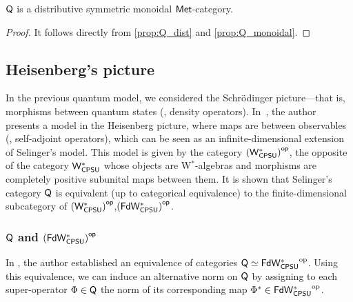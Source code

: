 \begin{theorem}
  $\mathsf{Q}$ is a distributive symmetric monoidal $\mathsf{Met}$-category. 
\end{theorem}

\begin{proof}
  It follows directly from \autoref{prop:Q_dist} and  \autoref{prop:Q_monoidal}.
\end{proof}


\subsection{Heisenberg's picture} \label{subsec:w*_cats}

In the previous quantum model, we considered the Schr\"odinger picture---that is, morphisms between quantum states (\ie, density operators). In~\cite{choSemanticsQuantumProgramming2016}, the author presents a model in the Heisenberg picture, where maps are between observables (\ie, self-adjoint operators), which can be seen as an infinite-dimensional extension of Selinger’s model. This model is given by the category $\left(\mathsf{W^*_{CPSU}}\right)^{\mathsf{op}}$, the opposite of the category $\mathsf{W^*_{CPSU}}$ whose objects are W$^*$-algebras and morphisms are completely positive subunital maps between them. It is shown that Selinger’s category $\mathsf{Q}$ is equivalent (up to categorical equivalence) to the finite-dimensional subcategory of $\left(\mathsf{W^*_{CPSU}}\right)^{\mathsf{op}}$,$\left(\mathsf{FdW^*_{CPSU}}\right)^{\mathsf{op}}$.






\subsubsection{$\mathsf{Q}$ and $\left(\mathsf{FdW^*_{CPSU}}\right)^{\mathsf{op}}$}




In \cite{choSemanticsQuantumProgramming2016}, the author established an equivalence of categories  
$\mathsf{Q} \simeq \mathsf{FdW^*_{CPSU}}^{\mathrm{op}}$.  
Using this equivalence, we can induce an alternative norm on $\mathsf{Q}$ by assigning to each super-operator $\Phi \in \mathsf{Q}$ the norm of its corresponding map $\Phi^* \in \mathsf{FdW^*_{CPSU}}^{\mathrm{op}}$.


